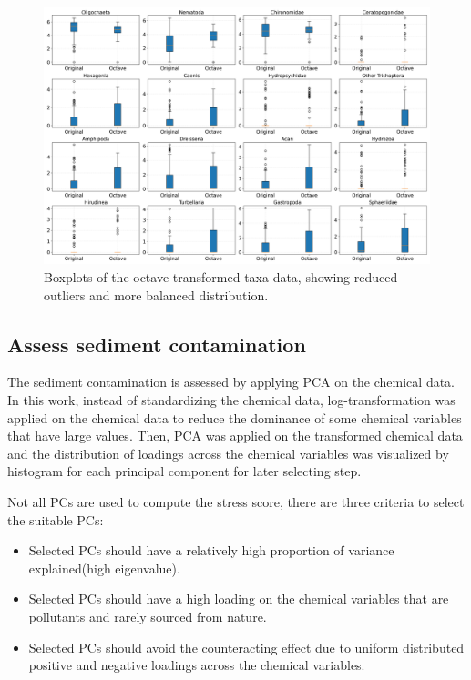 \begin{figure}[!h]
    \centering
    \includegraphics[width=\textwidth]{../results/preliminary_results/octave_transformed_taxa_boxplots.png}
    \caption{Boxplots of the octave-transformed taxa data, showing reduced outliers and more balanced distribution.}
    \label{fig:octave_transformed_taxa_boxplots}
\end{figure}

\subsection{Assess sediment contamination}

The sediment contamination is assessed by applying PCA on the chemical data.
In this work, instead of standardizing the chemical data, log-transformation was applied on the chemical data to 
reduce the dominance of some chemical variables that have large values. 
Then, PCA was applied on the transformed chemical data and the distribution of loadings across the chemical variables
was visualized by histogram for each principal component for later selecting step.

Not all PCs are used to compute the stress score, there are three criteria to select the suitable PCs:

\begin{itemize}
    \item Selected PCs should have a relatively high proportion of variance explained(high eigenvalue).
    \item Selected PCs should have a high loading on the chemical variables that are pollutants and rarely sourced from nature.
    \item Selected PCs should avoid the counteracting effect due to uniform distributed positive and negative loadings
    across the chemical variables.
\end{itemize}

